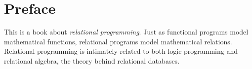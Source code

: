 \chapter{Preface}







This is a book about \emph{relational programming}. 
%
Just as functional programs model mathematical functions, relational programs model mathematical relations.
%
Relational programming is intimately related to both logic programming
and relational algebra, the theory behind relational databases.



